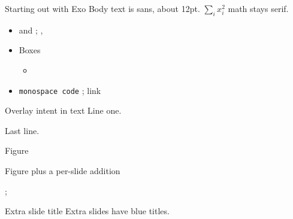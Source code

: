 \documentclass[aspectratio=169]{beamer}
\begin{document}
\begin{frame}[label=title]{Starting out with Exo}
Body text is sans, about 12pt. $\sum_i x_i^2$ math stays serif.
\begin{itemize}
  \item {} and ; , 
  \item Boxes     
  \begin{itemize}
    \item {}    
  \end{itemize}
  \item \texttt{monospace code} ; link 
\end{itemize}
\end{frame}
\begin{frame}[label=text]{Overlay intent in text}
Line one.




Last line.
\end{frame}
\begin{frame}[label=fig]{Figure}
\centering
\begin{sporkfigure}[node distance=4mm and 6mm]

\end{sporkfigure}
\end{frame}
\begin{frame}[label=fig_add]{Figure plus a per-slide addition}
\centering
\begin{sporkfigure}[scale=0.8, node distance=4mm and 6mm]

;
\end{sporkfigure}
\end{frame}
\sporkExtraSlides
\begin{frame}[label=extra]{Extra slide title}
Extra slides have blue titles.
\end{frame}
\end{document}
